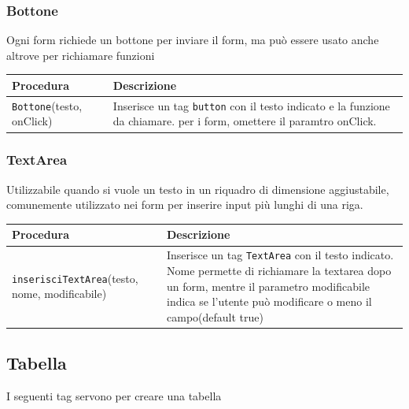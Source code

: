 \documentclass[a4paper,12pt]{article}
\begin{document}
\subsubsection{Bottone}
Ogni form richiede un bottone per inviare il form, ma può essere usato anche altrove per richiamare funzioni

\begin{longtable}{@{}p{5cm} p{8cm}@{}}
\toprule
\textbf{Procedura} & \textbf{Descrizione} \\ \midrule
\texttt{Bottone}(testo, onClick) & Inserisce un tag \texttt{button} con il testo indicato e la funzione da chiamare. per i form, omettere il paramtro onClick.  \\
\bottomrule
\end{longtable}

\subsubsection{TextArea}
Utilizzabile quando si vuole un testo in un riquadro di dimensione aggiustabile, comunemente utilizzato nei form per inserire input più lunghi di una riga.

\begin{longtable}{@{}p{5cm} p{8cm}@{}}
\toprule
\textbf{Procedura} & \textbf{Descrizione} \\ \midrule
\texttt{inserisciTextArea}(testo, nome, modificabile) & Inserisce un tag \texttt{TextArea} con il testo indicato. Nome permette di richiamare la textarea dopo un form, mentre il parametro modificabile indica se l'utente può modificare o meno il campo(default true) \\
\bottomrule
\end{longtable}

\subsection{Tabella}
I seguenti tag servono per creare una tabella
\end{document}
